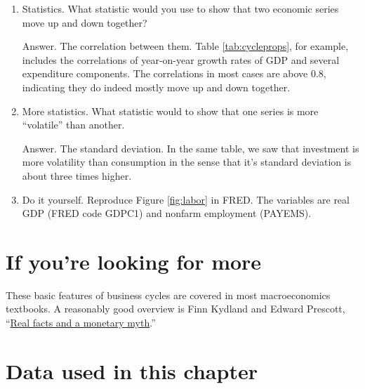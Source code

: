\setlength{\leftmargini}{.5\oldleftmargini}
\begin{enumerate}
\item Statistics.  What statistic would you use to show that two economic series
move up and down together?

Answer.  The correlation between them.
Table \ref{tab:cycleprops}, for example, includes the correlations
of year-on-year growth rates of GDP and several expenditure components.
The correlations in most cases are above 0.8, indicating they do indeed
mostly move up and down together.

\item More statistics.  What statistic would to show that one series is more ``volatile''
than another.

Answer.  The standard deviation.
In the same table, we saw that investment is more volatility than consumption
in the sense that it's standard deviation is about three times higher.

\item Do it yourself.  Reproduce Figure \ref{fig:labor} in FRED.
The variables are real GDP (FRED code GDPC1) and nonfarm employment
(PAYEMS).
\end{enumerate}
\setlength{\leftmargini}{\oldleftmargini}

\section*{If you're looking for more}

These basic features of business cycles are covered in most
macroeconomics textbooks.
A reasonably good overview is Finn Kydland and Edward Prescott,
``\href{http://www.minneapolisfed.org/publications_papers/pub_display.cfm?id=225}
{Real facts and a monetary myth}.''

\section*{Data used in this chapter}

